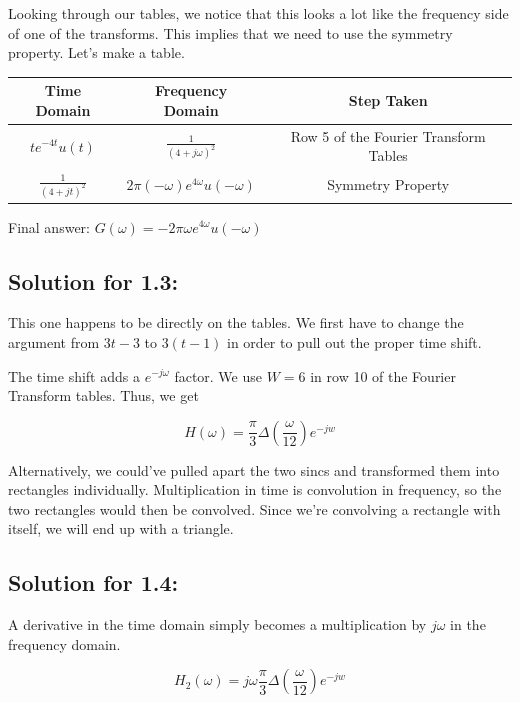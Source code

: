 \documentclass{article}
\begin{document}
Looking through our tables, we notice that this looks a lot like the frequency side of one of the transforms. This implies that we need to use the symmetry property. Let's make a table.

\begin{center}
\begin{tabular}{||c | c | c ||} 
 \hline
 Time Domain & Frequency Domain & Step Taken  \\ [1ex] 
 \hline\hline
 $te^{-4t}u(t)$ & $\frac{1}{(4 + j\omega)^2}$ & Row 5 of the Fourier Transform Tables \\ [1ex] 
 \hline
 $\frac{1}{(4 + jt)^2}$ & $2\pi (-\omega) e^{4 \omega} u(-\omega)$ & Symmetry Property \\ [1ex] 
 \hline
\end{tabular}
\end{center}

Final answer: $\boxed{G(\omega) = -2\pi\omega e^{4 \omega} u(-\omega)}$

\subsection{Solution for 1.3:}

This one happens to be directly on the tables. We first have to change the argument from $3t-3$ to $3(t-1)$ in order to pull out the proper time shift.

The time shift adds a $e^{-j\omega}$ factor. We use $W = 6$ in row 10 of the Fourier Transform tables. Thus, we get

$$\boxed{H(\omega) = \frac{\pi}{3} \Delta \left(\frac{\omega}{12}\right) e^{-jw}}$$

Alternatively, we could've pulled apart the two sincs and transformed them into rectangles individually. Multiplication in time is convolution in frequency, so the two rectangles would then be convolved. Since we're convolving a rectangle with itself, we will end up with a triangle.

\subsection{Solution for 1.4:}

A derivative in the time domain simply becomes a multiplication by $j \omega$ in the frequency domain.

$$\boxed{H_2(\omega) = j \omega \frac{\pi}{3} \Delta \left(\frac{\omega}{12}\right) e^{-jw}}$$

\newpage
\end{document}
